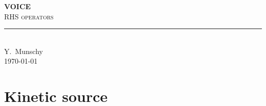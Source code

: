 \documentclass[11pt]{article}
\newcommand{\HRule}[1]{\rule{0.5\linewidth}{#1}}
\begin{document}
\begin{center}

    \LARGE \textbf{\uppercase{VOICE}}
    \vspace{0.8cm}  \\
    \normalsize \textsc{RHS operators} \\	%
    \vspace{0.4cm} 
    \HRule{0.5pt} \\
    \vspace{0.7cm}
    \normalsize Y.~Munschy
    \vspace{0.2cm} \\
    \today
\end{center}


\section{Kinetic source}
\label{sec:kinetic_source}
\end{document}
